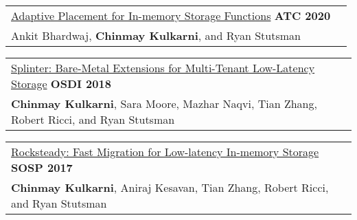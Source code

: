\documentclass[margin,line]{res}
\begin{document}
\begin{resume}
 \vspace{-2.5pt}
 \begin{tabular}{@{}p{5.5in}p{4in}}
 \href{http://utah.systems/projects/kulkarni\_splinter}{Adaptive
 Placement for In-memory Storage Functions} \hfill
 {\small\bf ATC 2020}\\
 {\small Ankit Bhardwaj, {\bf Chinmay Kulkarni}, and Ryan Stutsman}\\
 \end{tabular}

 \vspace{-2.5pt}
 \begin{tabular}{@{}p{5.5in}p{4in}}
 \href{http://utah.systems/projects/kulkarni\_splinter}{Splinter:
 Bare-Metal Extensions for Multi-Tenant Low-Latency Storage} \hfill
 {\small\bf OSDI 2018}\\
 {\small{\bf Chinmay Kulkarni}, Sara Moore, Mazhar Naqvi, Tian Zhang, Robert
 Ricci, and Ryan Stutsman}\\
 \end{tabular}

 \vspace{-2.5pt}
 \begin{tabular}{@{}p{5.5in}p{4in}}
 \href{http://utah.systems/projects/kulkarni\_rocksteady}{Rocksteady: Fast
 Migration for Low-latency In-memory Storage} \hfill
 {\small\bf SOSP 2017}\\
 {\small{\bf Chinmay Kulkarni}, Aniraj Kesavan, Tian Zhang, Robert
 Ricci, and Ryan Stutsman}\\
 \end{tabular}




\end{resume}
\end{document}

